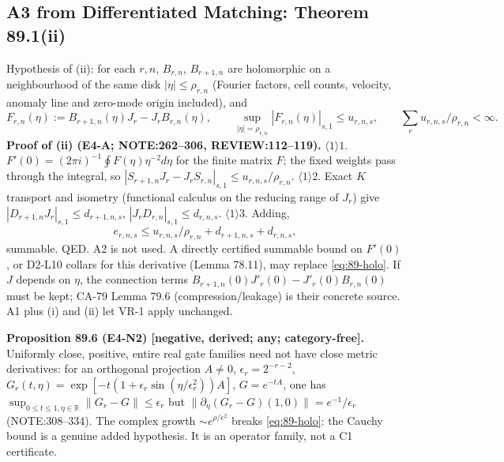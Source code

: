 \subsection{A3 from Differentiated Matching: Theorem 89.1(ii)}

Hypothesis of (ii): for each \(r,n\), \(B_{r,n}\), \(B_{r+1,n}\) are holomorphic on a neighbourhood of the same disk
\(|\eta|\le\rho_{r,n}\) (Fourier factors, cell counts, velocity, anomaly line and zero-mode origin included), and
\begin{equation}\label{eq:89-holo}
F_{r,n}(\eta):=B_{r+1,n}(\eta)J_r-J_rB_{r,n}(\eta),\qquad\sup_{|\eta|=\rho_{r,n}}|F_{r,n}(\eta)|_{s,1}\le u_{r,n,s},
\qquad\sum_ru_{r,n,s}/\rho_{r,n}<\infty .
\end{equation}
\textbf{Proof of (ii) (E4-A; NOTE:262--306, REVIEW:112--119).}  \(\langle1\rangle1\). \(F'(0)=(2\pi i)^{-1}\oint
F(\eta)\eta^{-2}d\eta\) for the finite matrix \(F\); the fixed weights pass through the integral, so
\(|S_{r+1,n}J_r-J_rS_{r,n}|_{s,1}\le u_{r,n,s}/\rho_{r,n}\).  \(\langle1\rangle2\). Exact \(K\) transport and isometry
(functional calculus on the reducing range of \(J_r\)) give \(|D_{r+1,n}J_r|_{s,1}\le d_{r+1,n,s}\),
\(|J_rD_{r,n}|_{s,1}\le d_{r,n,s}\).  \(\langle1\rangle3\). Adding,
\begin{equation}\label{eq:89-A3}
e_{r,n,s}\le u_{r,n,s}/\rho_{r,n}+d_{r+1,n,s}+d_{r,n,s},
\end{equation}
summable.  QED.  A2 is not used.  A directly certified summable bound on \(F'(0)\), or D2-L10 collars for this
derivative (Lemma 78.11), may replace \eqref{eq:89-holo}.  If \(J\) depends on \(\eta\), the connection terms
\(B_{r+1,n}(0)J'_r(0)-J'_r(0)B_{r,n}(0)\) must be kept; CA-79 Lemma 79.6 (compression/leakage) is their concrete
source.  A1 plus (i) and (ii) let VR-1 apply unchanged.

\textbf{Proposition 89.6 (E4-N2) [negative, derived; any; category-free].}  Uniformly close, positive, entire real
gate families need not have close metric derivatives: for an orthogonal projection \(A\neq0\),
\(\epsilon_r=2^{-r-2}\), \(G_r(t,\eta)=\exp[-t(1+\epsilon_r\sin(\eta/\epsilon_r^2))A]\), \(G=e^{-tA}\), one has
\(\sup_{0\le t\le1,\eta\in\mathbb R}\|G_r-G\|\le\epsilon_r\) but \(\|\partial_\eta(G_r-G)(1,0)\|=e^{-1}/\epsilon_r\)
(NOTE:308--334).  The complex growth \(\sim e^{\rho/\epsilon^2}\) breaks \eqref{eq:89-holo}: the Cauchy bound is a
genuine added hypothesis.  It is an operator family, not a C1 certificate.

